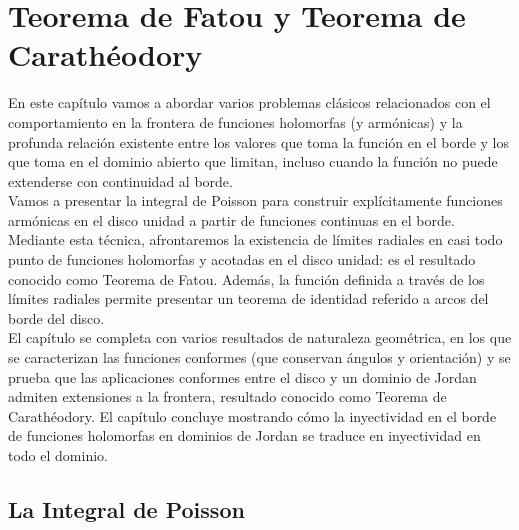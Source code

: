 \chapter{Teorema de Fatou y Teorema de Carathéodory}
\label{cap:fatou}

En este capítulo vamos a abordar varios problemas clásicos relacionados con el comportamiento en la frontera de funciones holomorfas (y armónicas) y la profunda relación existente entre los valores que toma la función en el borde y los que toma en el dominio abierto que limitan, incluso cuando la función no puede extenderse con continuidad al borde. \\

Vamos a presentar la integral de Poisson para construir explícitamente funciones armónicas en el disco unidad a partir de funciones continuas en el borde. Mediante esta técnica, afrontaremos la existencia de límites radiales en casi todo punto de funciones holomorfas y acotadas en el disco unidad: es el resultado conocido como Teorema de Fatou. Además, la función definida a través de los límites radiales permite presentar un teorema de identidad referido a arcos del borde del disco. \\

El capítulo se completa con varios resultados de naturaleza geométrica, en los que se caracterizan las funciones conformes (que conservan ángulos y orientación) y se prueba que las aplicaciones conformes entre el disco y un dominio de Jordan admiten extensiones a la frontera, resultado conocido como Teorema de Carathéodory. El capítulo concluye mostrando cómo la inyectividad en el borde de funciones holomorfas en dominios de Jordan se traduce en inyectividad en todo el dominio. \\

\section{La Integral de Poisson}

